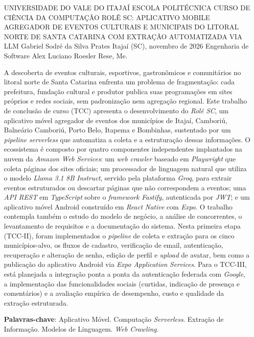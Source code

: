 
\begin{Info}
{UNIVERSIDADE DO VALE DO ITAJAÍ}
{ESCOLA POLITÉCNICA}
{CURSO DE CIÊNCIA DA COMPUTAÇÃO}
{ROLÊ SC: APLICATIVO MOBILE AGREGADOR DE EVENTOS CULTURAIS E MUNICIPAIS DO LITORAL NORTE DE SANTA CATARINA COM EXTRAÇÃO AUTOMATIZADA VIA LLM}
{Gabriel Sodré da Silva Prates}
{Itajaí (SC), novembro de 2026}
{Engenharia de Software}
{Alex Luciano Roesler Rese, Me.}
{}
\end{Info}


\begin{Resumo}
A descoberta de eventos culturais, esportivos, gastronômicos e comunitários no litoral norte de Santa Catarina enfrenta um problema de fragmentação: cada prefeitura, fundação cultural e produtor publica suas programações em sites próprios e redes sociais, sem padronização nem agregação regional. Este trabalho de conclusão de curso (TCC) apresenta o desenvolvimento do \textit{Rolê SC}, um aplicativo móvel agregador de eventos dos municípios de Itajaí, Camboriú, Balneário Camboriú, Porto Belo, Itapema e Bombinhas, sustentado por um \textit{pipeline serverless} que automatiza a coleta e a estruturação dessas informações. O ecossistema é composto por quatro componentes independentes implantados na nuvem da \textit{Amazon Web Services}: um \textit{web crawler} baseado em \textit{Playwright} que coleta páginas dos sites oficiais; um processador de linguagem natural que utiliza o modelo \textit{Llama 3.1 8B Instruct}, servido pela plataforma \textit{Groq}, para extrair eventos estruturados ou descartar páginas que não correspondem a eventos; uma \textit{API REST} em \textit{TypeScript} sobre o \textit{framework Fastify}, autenticada por \textit{JWT}; e um aplicativo móvel Android construído em \textit{React Native} com \textit{Expo}. O trabalho contempla também o estudo do modelo de negócio, a análise de concorrentes, o levantamento de requisitos e a documentação do sistema. Nesta primeira etapa (TCC-II), foram implementados o \textit{pipeline} de coleta e extração para os cinco municípios-alvo, os fluxos de cadastro, verificação de email, autenticação, recuperação e alteração de senha, edição de perfil e \textit{upload} de avatar, bem como a publicação do aplicativo Android via \textit{Expo Application Services}. Para o TCC-III, está planejada a integração ponta a ponta da autenticação federada com \textit{Google}, a implementação das funcionalidades sociais (curtidas, indicação de presença e comentários) e a avaliação empírica de desempenho, custo e qualidade da extração estruturada.

\textbf{Palavras-chave}: Aplicativo Móvel. Computação \textit{Serverless}. Extração de Informação. Modelos de Linguagem. \textit{Web Crawling}.
\end{Resumo}

